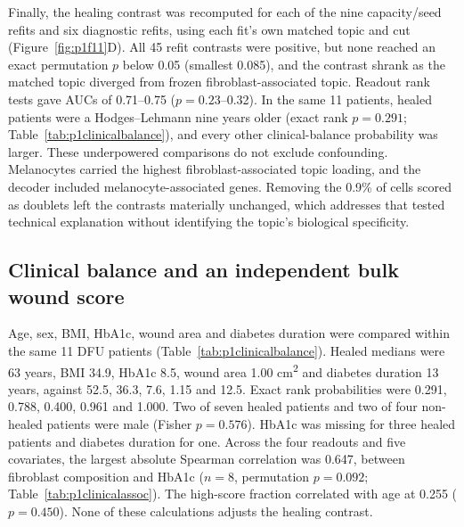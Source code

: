Finally, the healing contrast was recomputed for each of the nine capacity/seed refits and six diagnostic refits, using each fit's own matched topic and cut (Figure~\ref{fig:p1f11}D). All 45 refit contrasts were positive, but none reached an exact permutation $p$ below 0.05 (smallest 0.085), and the contrast shrank as the matched topic diverged from frozen fibroblast-associated topic. Readout rank tests gave AUCs of 0.71--0.75 ($p=0.23$--0.32). In the same 11 patients, healed patients were a Hodges--Lehmann nine years older (exact rank $p=0.291$; Table~\ref{tab:p1clinicalbalance}), and every other clinical-balance probability was larger. These underpowered comparisons do not exclude confounding. Melanocytes carried the highest fibroblast-associated topic loading, and the decoder included melanocyte-associated genes. Removing the 0.9\% of cells scored as doublets left the contrasts materially unchanged, which addresses that tested technical explanation without identifying the topic's biological specificity.



\subsection{Clinical balance and an independent bulk wound score}

Age, sex, BMI, HbA1c, wound area and diabetes duration were compared within the same 11 DFU patients (Table~\ref{tab:p1clinicalbalance}). Healed medians were 63 years, BMI 34.9, HbA1c 8.5, wound area 1.00 cm\textsuperscript{2} and diabetes duration 13 years, against 52.5, 36.3, 7.6, 1.15 and 12.5. Exact rank probabilities were 0.291, 0.788, 0.400, 0.961 and 1.000. Two of seven healed patients and two of four non-healed patients were male (Fisher $p=0.576$). HbA1c was missing for three healed patients and diabetes duration for one. Across the four readouts and five covariates, the largest absolute Spearman correlation was 0.647, between fibroblast composition and HbA1c ($n=8$, permutation $p=0.092$; Table~\ref{tab:p1clinicalassoc}). The high-score fraction correlated with age at 0.255 ($p=0.450$). None of these calculations adjusts the healing contrast.

